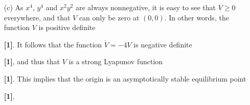 \documentclass[a4paper]{article}
\newcounter{probcounter}
\newcounter{marksawarded}
\newcommand{\mks}[1]{%
\addtocounter{marksawarded}{#1}%
\textbf{\color{red}[#1]}}
\newcommand{\mk}{\mks{1}}
\newenvironment{solution}{\comment}{\endcomment}
\newenvironment{solution}{
{\bigskip\par\noindent \bf Solution:}}{
\newpage
\typeout{Q\arabic{probcounter}: \arabic{marksawarded} marks awarded}
}
\begin{document}
\begin{solution}
\begin{itemize}
\begin{itemize}
\[                 -6x^2-y^2 & -2xy-1 \ebm, \mk
     \]
     and this becomes $J=-I$ at the origin \mk.  The linearisation
     therefore has an asymptotically stable node at the origin \mk.  The
     eigenvalues are both equal to $-1$, so the real part is nonzero,
     so the Hartman-Grobman theorem is applicable.  We can thus deduce
     that the original system also has an asymptotically stable
     equilibrium at the origin \mks{3}.
    \item[(c)] As $x^4$, $y^4$ and $x^2y^2$ are always nonnegative, it
     is easy to see that $V\geq 0$ everywhere, and that $V$ can only
     be zero at $(0,0)$.  In other words, the function $V$ is positive
     definite \mk.  It follows that the function $\dot{V}=-4V$ is negative
     definite \mk, and thus that $V$ is a strong Lyapunov function \mk.  This
     implies that the origin is an asymptotically stable equilibrium
     point \mk. 
   \end{itemize}
 \end{itemize}
\end{solution}
\end{document}
